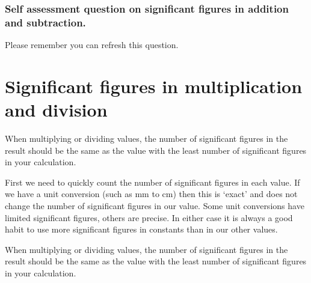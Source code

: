 \documentclass[
  letterpaper,
  DIV=11,
  numbers=noendperiod]{scrreprt}
\newcounter{quartocallouttipno}
\newcommand{\quartocallouttip}[1]{\refstepcounter{quartocallouttipno}\label{#1}}
\begin{document}
\subsubsection{Self assessment question on significant figures in
addition and
subtraction.}\label{self-assessment-question-on-significant-figures-in-addition-and-subtraction.}

Please remember you can refresh this question.

\section{Significant figures in multiplication and
division}\label{sec-sfmuldiv}

When multiplying or dividing values, the number of significant figures
in the result should be the same as the value with the least number of
significant figures in your calculation.

First we need to quickly count the number of significant figures in each
value. If we have a unit conversion (such as mm to cm) then this is
`exact' and does not change the number of significant figures in our
value. Some unit conversions have limited significant figures, others
are precise. In either case it is always a good habit to use more
significant figures in constants than in our other values.

\begin{tcolorbox}[enhanced jigsaw, arc=.35mm, bottomrule=.15mm, bottomtitle=1mm, breakable, colback=white, colbacktitle=quarto-callout-tip-color!10!white, colframe=quarto-callout-tip-color-frame, coltitle=black, left=2mm, leftrule=.75mm, opacityback=0, opacitybacktitle=0.6, rightrule=.15mm, title=\textcolor{quarto-callout-tip-color}{\faLightbulb}\hspace{0.5em}{Tip \ref*{tip-scales}: Significant figures in multiplication and division.}, titlerule=0mm, toprule=.15mm, toptitle=1mm]

\quartocallouttip{tip-scales} 

When multiplying or dividing values, the number of significant figures
in the result should be the same as the value with the least number of
significant figures in your calculation.

\end{tcolorbox}
\end{document}
